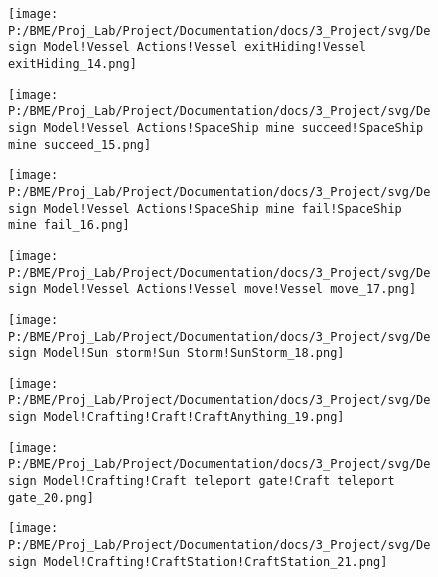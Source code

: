 \begin{figure}[H] 
\centering 
\texttt{[image: P:/BME/Proj\_Lab/Project/Documentation/docs/3\_Project/svg/Design Model!Vessel Actions!Vessel exitHiding!Vessel exitHiding\_14.png]} 
\caption{} 
\end{figure} 

\begin{figure}[H] 
\centering 
\texttt{[image: P:/BME/Proj\_Lab/Project/Documentation/docs/3\_Project/svg/Design Model!Vessel Actions!SpaceShip mine succeed!SpaceShip mine succeed\_15.png]} 
\caption{} 
\end{figure} 

\begin{figure}[H] 
\centering 
\texttt{[image: P:/BME/Proj\_Lab/Project/Documentation/docs/3\_Project/svg/Design Model!Vessel Actions!SpaceShip mine fail!SpaceShip mine fail\_16.png]} 
\caption{} 
\end{figure} 

\begin{figure}[H] 
\centering 
\texttt{[image: P:/BME/Proj\_Lab/Project/Documentation/docs/3\_Project/svg/Design Model!Vessel Actions!Vessel move!Vessel move\_17.png]} 
\caption{} 
\end{figure} 

\begin{figure}[H] 
\centering 
\texttt{[image: P:/BME/Proj\_Lab/Project/Documentation/docs/3\_Project/svg/Design Model!Sun storm!Sun Storm!SunStorm\_18.png]} 
\caption{} 
\end{figure} 

\begin{figure}[H] 
\centering 
\texttt{[image: P:/BME/Proj\_Lab/Project/Documentation/docs/3\_Project/svg/Design Model!Crafting!Craft!CraftAnything\_19.png]} 
\caption{} 
\end{figure} 

\begin{figure}[H] 
\centering 
\texttt{[image: P:/BME/Proj\_Lab/Project/Documentation/docs/3\_Project/svg/Design Model!Crafting!Craft teleport gate!Craft teleport gate\_20.png]} 
\caption{} 
\end{figure} 

\begin{figure}[H] 
\centering 
\texttt{[image: P:/BME/Proj\_Lab/Project/Documentation/docs/3\_Project/svg/Design Model!Crafting!CraftStation!CraftStation\_21.png]} 
\caption{} 
\end{figure} 

